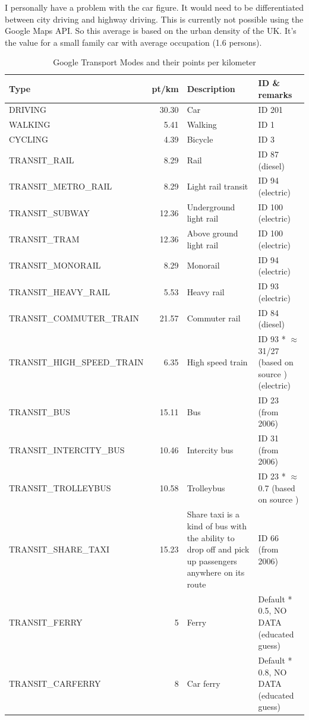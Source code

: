 \documentclass[final,a4paper,11pt]{article}
\begin{document}
I personally have a problem with the car figure. It would need to be differentiated between city driving and highway driving. This is currently not possible using the Google Maps API. So this average is based on the urban density of the UK. It's the value for a small family car with average occupation (1.6 persons).
\begin{table}[H]
\caption{Google Transport Modes and their points per kilometer \cite{ben-lane-lca}}
\label{tab:google-transport-modes}
\begin{tabular}{l|r|p{4cm}|p{4cm}}
\textbf{Type} & \textbf{pt/km} & \textbf{Description} & \textbf{ID \& remarks} \\
\hline
\hline
DRIVING & 30.30 & Car & ID 201 \\
WALKING & 5.41 & Walking & ID 1 \\
CYCLING & 4.39 & Bicycle & ID 3 \\
TRANSIT\_RAIL & 8.29 & Rail & ID 87 (diesel)\\
TRANSIT\_METRO\_RAIL & 8.29 & Light rail transit & ID 94 (electric)\\
TRANSIT\_SUBWAY & 12.36 & Underground light rail & ID 100 (electric) \\
TRANSIT\_TRAM & 12.36 & Above ground light rail & ID 100 (electric) \\
TRANSIT\_MONORAIL & 8.29 & Monorail & ID 94 (electric) \\
TRANSIT\_HEAVY\_RAIL & 5.53 & Heavy rail & ID 93 (electric) \\
TRANSIT\_COMMUTER\_TRAIN & 21.57 & Commuter rail & ID 84 (diesel) \\
TRANSIT\_HIGH\_SPEED\_TRAIN & 6.35 & High speed train & ID 93 * $\approx$ 31/27 (based on source \cite[p. 35]{network-rail-comparison}) (electric) \\
TRANSIT\_BUS & 15.11 & Bus & ID 23 (from 2006)\\
TRANSIT\_INTERCITY\_BUS & 10.46 & Intercity bus & ID 31 (from 2006)\\
TRANSIT\_TROLLEYBUS & 10.58 & Trolleybus & ID 23 * $\approx$ 0.7 (based on source \cite[p. 101]{life-cycle-buses})\\
TRANSIT\_SHARE\_TAXI & 15.23 & Share taxi is a kind of bus with the ability to drop off and pick up passengers anywhere on its route & ID 66 (from 2006) \\
TRANSIT\_FERRY & 5 & Ferry & Default * 0.5, NO DATA (educated guess)\\
TRANSIT\_CARFERRY & 8 & Car ferry & Default * 0.8, NO DATA (educated guess)\\

\end{tabular}
\end{table}
\end{document}
